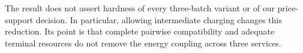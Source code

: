 The result does not assert hardness of every three-batch variant or of
our price-support decision. In particular, allowing intermediate charging
changes this reduction. Its point is that complete pairwise compatibility
and adequate terminal resources do not remove the energy coupling across
three services.
